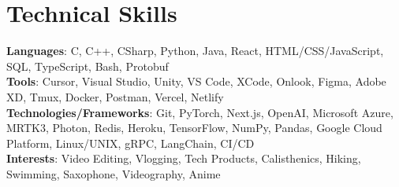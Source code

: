 \documentclass[letterpaper,11pt]{article}
\begin{document}
\section{Technical Skills}

    \vspace{-7pt}
    \begin{itemize}
    [leftmargin=0.15in, label={}]\small{\item{
        \textbf{Languages}{: C, C++, CSharp, Python, Java, React, HTML/CSS/JavaScript, SQL, TypeScript, Bash, Protobuf} \\
        \textbf{Tools}{: Cursor, Visual Studio, Unity, VS Code, XCode, Onlook, Figma, Adobe XD, Tmux, Docker, Postman, Vercel, Netlify } \\
        \textbf{Technologies/Frameworks}{: Git, PyTorch, Next.js, OpenAI, Microsoft Azure, MRTK3, Photon, Redis, Heroku, TensorFlow, NumPy, Pandas, Google Cloud Platform, Linux/UNIX, gRPC, LangChain, CI/CD} \\
        \textbf{Interests}{: Video Editing, Vlogging, Tech Products, Calisthenics, Hiking, Swimming, Saxophone, Videography, Anime} \\}}
    \end{itemize}
\end{document}
